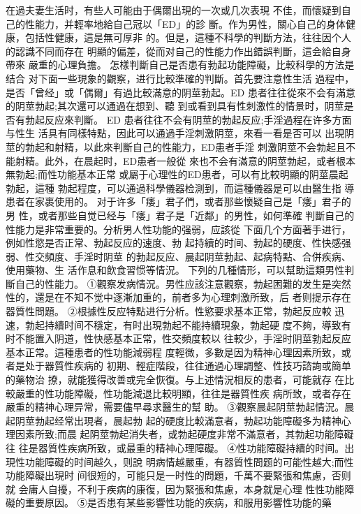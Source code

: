 \documentclass[12pt,UTF8]{ctexbook}
\begin{document}
在過夫妻生活时，有些人可能由于偶爾出現的一次或几次表現
不佳，而懷疑到自己的性能力，并輕率地給自己冠以「ED」的診
斷。作为男性，關心自己的身体健康，包括性健康，這是無可厚非
的。但是，這種不科學的判斷方法，往往因个人的認識不同而存在
明顯的偏差，從而对自己的性能力作出錯誤判斷，這会給自身帶來
嚴重的心理負擔。
怎樣判斷自己是否患有勃起功能障礙，比較科學的方法是结合
对下面一些現象的觀察，进行比較準確的判斷。首先要注意性生活
過程中，是否「曾经」或「偶爾」有過比較滿意的阴莖勃起。ED
患者往往從來不会有滿意的阴莖勃起;其次還可以通過在想到、聽
到或看到具有性刺激性的情景时，阴莖是否有勃起反应來判斷。
ED 患者往往不会有阴莖的勃起反应;手淫過程在许多方面与性生
活具有同樣特點，因此可以通過手淫刺激阴莖，來看一看是否可以
出現阴莖的勃起和射精，以此來判斷自己的性能力，ED患者手淫
刺激阴莖不会勃起且不能射精。此外，在晨起时，ED患者一般從
來也不会有滿意的阴莖勃起，或者根本無勃起;而性功能基本正常
或屬于心理性的ED患者，可以有比較明顯的阴莖晨起勃起，這種
勃起程度，可以通過科學儀器检測到，而這種儀器是可以由醫生指
導患者在家裹使用的。
对于许多「痿」君子們，或者那些懷疑自己是「痿」君子的男
性，或者那些自觉已经与「痿」君子是「近鄰」的男性，如何準確
判斷自己的性能力是非常重要的。分析男人性功能的强弱，应該從
下面几个方面著手进行，例如性慾是否正常、勃起反应的速度、勃
起持續的时间、勃起的硬度、性快感强弱、性交頻度、手淫时阴莖
的勃起反应、晨起阴莖勃起、起病特點、合併疾病、使用藥物、生
活作息和飲食習惯等情況。
下列的几種情形，可以幫助這類男性判斷自己的性能力。
①觀察发病情況。男性应該注意觀察，勃起困難的发生是突然
性的，還是在不知不觉中逐漸加重的，前者多为心理刺激所致，后
者则提示存在器質性問題。
②根據性反应特點进行分析。性慾要求基本正常，勃起反应較
迅速，勃起持續时间不穩定，有时出現勃起不能持續現象，勃起硬
度不夠，導致有时不能置入阴道，性快感基本正常，性交頻度較以
往較少，手淫时阴莖勃起反应基本正常。這種患者的性功能減弱程
度輕微，多數是因为精神心理因素所致，或者是处于器質性疾病的
初期、輕症階段，往往通過心理調整、性技巧諮詢或簡单的藥物治
撩，就能獲得改善或完全恢復。与上述情況相反的患者，可能就存
在比較嚴重的性功能障礙，性功能減退比較明顯，往往是器質性疾
病所致，或者存在嚴重的精神心理异常，需要儘早尋求醫生的幫
助。
③觀察晨起阴莖勃起情況。晨起阴莖勃起经常出現者，晨起勃
起的硬度比較滿意者，勃起功能障礙多为精神心理因素所致;而晨
起阴莖勃起消失者，或勃起硬度非常不滿意者，其勃起功能障礙往
往是器質性疾病所致，或最重的精神心理障礙。
④性功能障礙持續的时间。出現性功能障礙的时间越久，则說
明病情越嚴重，有器質性問题的可能性越大;而性功能障礙出現时
间很短的，可能只是一时性的問題，千萬不要緊張和焦慮，否则就
会庸人自擾，不利于疾病的康復，因为緊張和焦慮，本身就是心理
性性功能障礙的重要原因。
⑤是否患有某些影響性功能的疾病，和服用影響性功能的藥
\end{document}
